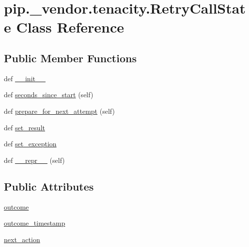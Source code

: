 \hypertarget{classpip_1_1__vendor_1_1tenacity_1_1RetryCallState}{}\section{pip.\+\_\+vendor.\+tenacity.\+Retry\+Call\+State Class Reference}
\label{classpip_1_1__vendor_1_1tenacity_1_1RetryCallState}
\subsection*{Public Member Functions}
\begin{DoxyCompactItemize}
\item 
def \hyperlink{classpip_1_1__vendor_1_1tenacity_1_1RetryCallState_ac93573518a16c96f428383cb2c502d39}{\+\_\+\+\_\+init\+\_\+\+\_\+}
\item 
def \hyperlink{classpip_1_1__vendor_1_1tenacity_1_1RetryCallState_ac11bbf8f65e3eb855b1bb0cbe01f48c8}{seconds\+\_\+since\+\_\+start} (self)
\item 
def \hyperlink{classpip_1_1__vendor_1_1tenacity_1_1RetryCallState_a403d156da5df8b5a0a38ef4b32f15fd9}{prepare\+\_\+for\+\_\+next\+\_\+attempt} (self)
\item 
def \hyperlink{classpip_1_1__vendor_1_1tenacity_1_1RetryCallState_a7ac196d420d350bd7cc3e44da108c302}{set\+\_\+result}
\item 
def \hyperlink{classpip_1_1__vendor_1_1tenacity_1_1RetryCallState_a574031783d11b1c756cbf3882bd012b0}{set\+\_\+exception}
\item 
def \hyperlink{classpip_1_1__vendor_1_1tenacity_1_1RetryCallState_a3aeaa46167381a6489742d11225b10be}{\+\_\+\+\_\+repr\+\_\+\+\_\+} (self)
\end{DoxyCompactItemize}
\subsection*{Public Attributes}
\begin{DoxyCompactItemize}
\item 
\hyperlink{classpip_1_1__vendor_1_1tenacity_1_1RetryCallState_a1f083eb19763a11af42e28c056d5d4cc}{outcome}
\item 
\hyperlink{classpip_1_1__vendor_1_1tenacity_1_1RetryCallState_a0e142db6b4815d8e8b9fbed5dffb070c}{outcome\+\_\+timestamp}
\item 
\hyperlink{classpip_1_1__vendor_1_1tenacity_1_1RetryCallState_abbada559edd5410f5aa7e1bca111119b}{next\+\_\+action}
\end{DoxyCompactItemize}
